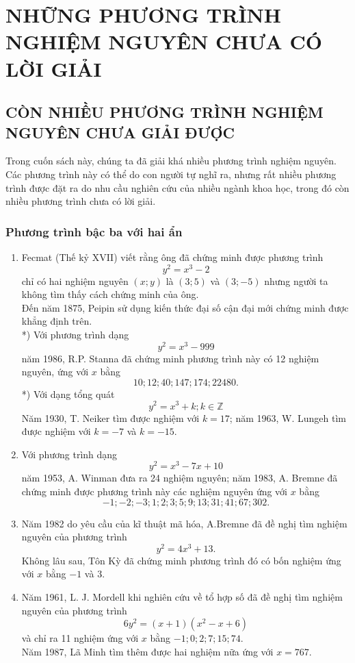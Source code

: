 
\chapter{NHỮNG PHƯƠNG TRÌNH NGHIỆM NGUYÊN CHƯA CÓ LỜI GIẢI}

\section{CÒN NHIỀU PHƯƠNG TRÌNH NGHIỆM NGUYÊN CHƯA GIẢI ĐƯỢC}

Trong cuốn sách này, chúng ta đã giải khá nhiều phương trình nghiệm nguyên. Các phương trình này có thể do con người tự nghĩ ra, nhưng rất nhiều phương trình được đặt ra do nhu cầu nghiên cứu của nhiều ngành khoa học, trong đó còn nhiều phương trình chưa có lời giải.
\subsection{Phương trình bậc ba với hai ẩn}
\begin{enumerate}
	\item  Fecmat (Thế kỷ XVII) viết rằng ông đã chứng minh được phương trình $$ y^2=x^3-2$$ chỉ có hai nghiệm nguyên $(x;y)$ là $(3;5)$ và $(3;-5)$ nhưng người ta không tìm thấy cách chứng minh của ông.\\
	Đến năm 1875, Peipin sử dụng kiến thức đại số cận đại mới chứng minh được khẳng định trên.\\
	*) Với phương trình dạng $$ y^2=x^3-999$$ năm 1986, R.P. Stanna đã chứng minh phương trình này có 12 nghiệm nguyên, ứng với $x$ bằng $$10; 12; 40; 147; 174; 22480.$$
	*) Với dạng tổng quát $$ y^2=x^3+k; k\in \mathbb{Z}$$
	Năm 1930, T. Neiker tìm được nghiệm với $k=17$; năm 1963, W. Lungeh tìm được nghiệm với $k=-7$ và $k=-15.$
	
	\item Với phương trình dạng $$y^2=x^3-7x+10$$ năm 1953, A. Winman đưa ra 24 nghiệm nguyên; năm 1983, A. Bremne đã chứng minh được phương trình này các nghiệm nguyên ứng với $x$ bằng $$-1;-2;-3;1;2;3;5;9;13;31;41;67;302.$$
	\item  Năm 1982 do yêu cầu của kĩ thuật mã hóa, A.Bremne đã đề nghị tìm nghiệm nguyên của phương trình $$ y^2=4x^3+13.$$ 
	Không lâu sau, Tôn Kỳ đã chứng minh phương trình đó có bốn nghiệm ứng với $x$ bằng $-1$ và $3$.
	
	\item  Năm 1961, L. J. Mordell khi nghiên cứu về tổ hợp số đã đề nghị tìm nghiệm nguyên của phương trình $$ 6y^2=(x+1)(x^2-x+6)$$
	và chỉ ra 11 nghiệm ứng với $x$ bằng $-1;0;2;7;15;74.$\\
	Năm 1987, Lã Minh tìm thêm được hai nghiệm nữa ứng với $x=767.$
\end{enumerate}
